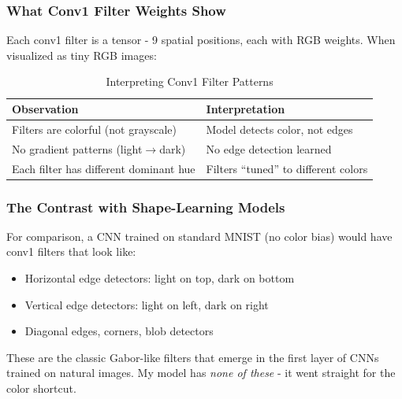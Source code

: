 \documentclass[9pt,a4paper,twocolumn,twoside]{tau-class/tau}
\begin{document}
        \subsubsection{What Conv1 Filter Weights Show}

        Each conv1 filter is a  tensor - 9 spatial positions, each with RGB weights. When visualized as tiny RGB images:

        \begin{table}[H]
            \caption{Interpreting Conv1 Filter Patterns}
            \label{tab:day6_filters}
            \begin{tabular}{ll}
            \toprule
            \textbf{Observation} & \textbf{Interpretation} \\
            \midrule
            Filters are colorful (not grayscale) & Model detects color, not edges \\
            No gradient patterns (light$\rightarrow$dark) & No edge detection learned \\
            Each filter has different dominant hue & Filters ``tuned'' to different colors \\
            \bottomrule
            \end{tabular}
        \end{table}

        \subsubsection{The Contrast with Shape-Learning Models}

        For comparison, a CNN trained on standard MNIST (no color bias) would have conv1 filters that look like:
        \begin{itemize}
            \item Horizontal edge detectors: light on top, dark on bottom
            \item Vertical edge detectors: light on left, dark on right
            \item Diagonal edges, corners, blob detectors
        \end{itemize}

        These are the classic Gabor-like filters that emerge in the first layer of CNNs trained on natural images. My model has \textit{none of these} - it went straight for the color shortcut.
\end{document}
